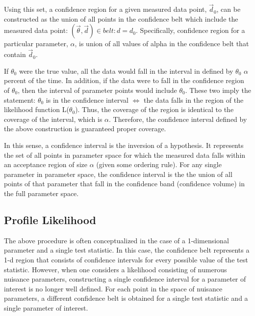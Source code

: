 Using this set, a confidence region for a given measured data point, $\vec{d}_0$, can be constructed as the union of all points in the confidence belt which include the measured data point: ${ ( \vec{ \theta }, \vec{d}) \in belt : d = d_{0}}$.
Specifically, confidence region for a particular parameter, $\alpha$, is union of all values of alpha in the confidence belt that contain $\vec{d}_0$.

If $\theta_0$ were the true value, all the data would fall in the interval in defined by $\theta_0$ $\alpha$ percent of the time.
In addition, if the data were to fall in the confidence region of $\theta_0$, then the interval of parameter points would include $\theta_0$.
These two imply the statement: $\theta_0$ is in the confidence interval $\iff$ the data falls in the region of the likelihood function L($\theta_0$).
Thus, the coverage of the region is identical to the coverage of the interval, which is $\alpha$.
Therefore, the confidence interval defined by the above construction is guaranteed proper coverage.

In this sense, a confidence interval is the inversion of a hypothesis.
It represents the set of all points in parameter space for which the measured data falls within an acceptance region of size $\alpha$ (given some ordering rule).
For any single parameter in parameter space, the confidence interval is the the union of all points of that parameter that fall in the confidence band (confidence volume) in the full parameter space.


\subsection{Profile Likelihood}

The above procedure is often conceptualized in the case of a 1-dimensional parameter and a single test statistic.
In this case, the confidence belt represents a 1-d region that consists of confidence intervals for every possible value of the test statistic.
However, when one considers a likelihood consisting of numerous nuisance parameters, constructing a single confidence interval for a parameter of interest is no longer well defined.
For each point in the space of nuisance parameters, a different confidence belt is obtained for a single test statistic and a single parameter of interest.


